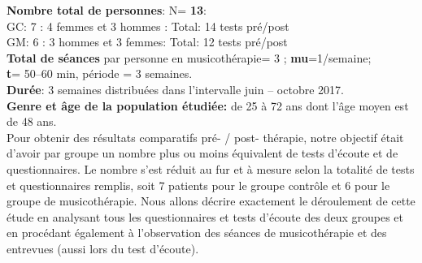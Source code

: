 \textbf{Nombre total de personnes}: N=  \textbf{13}:
\\
	GC: 7 : 4 femmes et 3 hommes : Total: 14 tests pré/post
\\ 	
	GM: 6 : 3 hommes et 3 femmes: Total: 12 tests pré/post
	\\
\textbf{Total de séances} par personne en
   musicothérapie= 3 ;   \textbf{mu}=1/semaine;
   \\
 \textbf{t}= 50--60 min, période = 3 semaines.
 \\
  \textbf{Durée}: 3 semaines distribuées dans l'intervalle juin -- octobre 2017.
  \\
 \textbf{Genre et âge de la population étudiée:}  de 25 à 72
 ans dont l'âge moyen est de 48 ans.
 \\
 Pour obtenir des  résultats comparatifs pré- / post- thé\-ra\-pie, notre  objectif était d'avoir par groupe 
 un nombre   
   plus ou moins équivalent de tests d'écoute et de  questionnaires. Le nombre s'est réduit au fur et à 
   mesure selon la totalité de tests et questionnaires remplis, soit  7 patients pour le groupe contrôle et 6 
   pour le groupe de musicothérapie.
 Nous allons décrire exactement le déroulement de cette étude en analysant 
 tous les questionnaires et tests d'écoute des deux groupes et en procédant également à l'observation 
 des séances de musicothérapie et des entrevues (aussi lors du test d'écoute).
 


